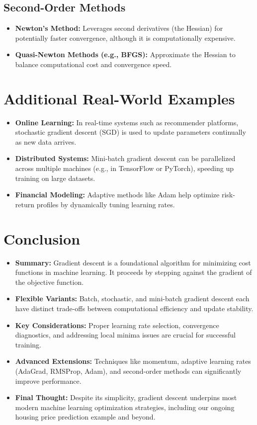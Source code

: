 \documentclass{article}
\begin{document}
\subsection{Second-Order Methods}
\begin{itemize}
    \item \textbf{Newton's Method:} Leverages second derivatives (the Hessian) for potentially faster convergence, although it is computationally expensive.
    \item \textbf{Quasi-Newton Methods (e.g., BFGS):} Approximate the Hessian to balance computational cost and convergence speed.
\end{itemize}

\section{Additional Real-World Examples}

\begin{itemize}
    \item \textbf{Online Learning:} In real-time systems such as recommender platforms, stochastic gradient descent (SGD) is used to update parameters continually as new data arrives.
    \item \textbf{Distributed Systems:} Mini-batch gradient descent can be parallelized across multiple machines (e.g., in TensorFlow or PyTorch), speeding up training on large datasets.
    \item \textbf{Financial Modeling:} Adaptive methods like Adam help optimize risk-return profiles by dynamically tuning learning rates.
\end{itemize}

\section{Conclusion}

\begin{itemize}
    \item \textbf{Summary:} Gradient descent is a foundational algorithm for minimizing cost functions in machine learning. It proceeds by stepping against the gradient of the objective function.
    \item \textbf{Flexible Variants:} Batch, stochastic, and mini-batch gradient descent each have distinct trade-offs between computational efficiency and update stability.
    \item \textbf{Key Considerations:} Proper learning rate selection, convergence diagnostics, and addressing local minima issues are crucial for successful training.
    \item \textbf{Advanced Extensions:} Techniques like momentum, adaptive learning rates (AdaGrad, RMSProp, Adam), and second-order methods can significantly improve performance.
    \item \textbf{Final Thought:} Despite its simplicity, gradient descent underpins most modern machine learning optimization strategies, including our ongoing housing price prediction example and beyond.
\end{itemize}
\end{document}
